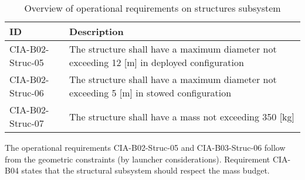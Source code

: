 \begin{table}[H]
	\caption{Overview of operational requirements on structures subsystem}
	\begin{tabular}{|p{}|p{}|}
    \hline
    ID          & Description                                                                                                      \\ \hline \hline
    CIA-B02-Struc-05 & The structure shall have a maximum diameter not exceeding 12 [m] in deployed configuration     \\ \hline
    CIA-B02-Struc-06 &  The structure shall have a maximum diameter not exceeding 5 [m] in stowed configuration                              \\ \hline
    CIA-B02-Struc-07 & The structure shall have a mass not exceeding 350 [kg]\\ \hline
    \end{tabular}
    \label{tab:strucoprequirements}
\end{table}
The operational requirements CIA-B02-Struc-05 and CIA-B03-Struc-06 follow from the geometric constraints (by launcher considerations). Requirement CIA-B04 states that the structural subsystem should respect the mass budget.